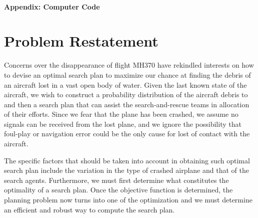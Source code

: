\documentclass[12pt, letterpaper]{article}  %
\theoremstyle{definition}
\theoremstyle{remark}
\theoremstyle{plain}
\begin{document}
\newpage



   \doublespacing


\tableofcontents
\ \\

\textbf{Appendix: Computer Code}\\

\newpage

\setcounter{page}{1}   




\section{Problem Restatement}\label{sec:restate}

Concerns over the disappearance of flight MH370 have rekindled interests on how to devise an optimal search plan to maximize our chance at finding the debris of an aircraft lost in a vast open body of water. Given the last known state of the aircraft, we wish to construct a probability distribution of the aircraft debris to and then a search plan that can assist the search-and-rescue teams in allocation of their efforts. Since we fear that the plane has been crashed, we assume no signals can be received from the lost plane, and we ignore the possibility that foul-play or navigation error could be the only cause for lost of contact with the aircraft.

The specific factors that should be taken into account in obtaining such optimal search plan
include the variation in the type of crashed airplane and that of the search agents. Furthermore, we must first determine what constitutes the optimality of a search plan. Once the objective function is determined, the planning problem now turns into one of the optimization and we must
determine an efficient and robust way to compute the search plan.
\end{document}

